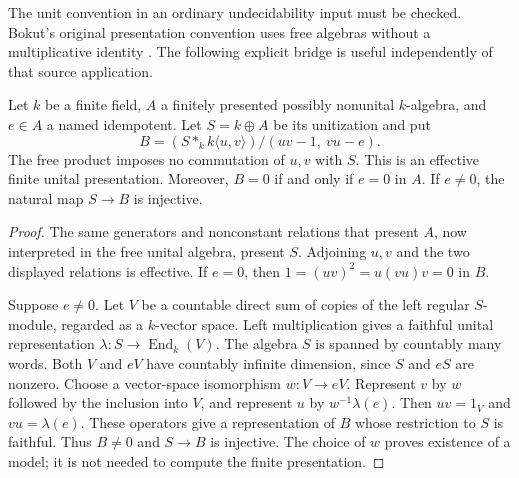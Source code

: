 The unit convention in an ordinary undecidability input must be
checked. Bokut's original presentation convention uses free
algebras without a multiplicative identity
\cite[Section~2, p.~137]{Bokut}. The following explicit bridge is
useful independently of that source application.
\begin{lemma}\label{lem:unital-idempotent-bridge}
Let $k$ be a finite field, $A$ a finitely presented possibly nonunital
$k$-algebra, and $e\in A$ a named idempotent. Let $S=k\oplus A$ be
its unitization and put
\[
 B=(S*_k k\langle u,v\rangle)/(uv-1,\ vu-e).
\]
The free product imposes no commutation of $u,v$ with $S$.
This is an effective finite unital presentation. Moreover, $B=0$
if and only if $e=0$ in $A$. If $e\ne0$, the natural map $S\to B$
is injective.
\end{lemma}
\begin{proof}
The same generators and nonconstant relations that present $A$,
now interpreted in the free unital algebra, present $S$.
Adjoining $u,v$ and the two displayed relations is effective.
If $e=0$, then $1=(uv)^2=u(vu)v=0$ in $B$.

Suppose $e\ne0$. Let $V$ be a countable direct sum of copies of the
left regular $S$-module, regarded as a $k$-vector space. Left
multiplication gives a faithful unital representation
$\lambda:S\to\operatorname{End}_k(V)$.
The algebra $S$ is spanned by countably many words. Both $V$ and
$eV$ have countably infinite dimension, since $S$ and $eS$ are
nonzero. Choose a vector-space isomorphism $w:V\to eV$.
Represent $v$ by $w$ followed by the inclusion into $V$, and
represent $u$ by $w^{-1}\lambda(e)$. Then $uv=1_V$ and
$vu=\lambda(e)$. These operators give a representation of $B$
whose restriction to $S$ is faithful. Thus $B\ne0$ and $S\to B$
is injective. The choice of $w$ proves existence of a model;
it is not needed to compute the finite presentation.
\end{proof}

